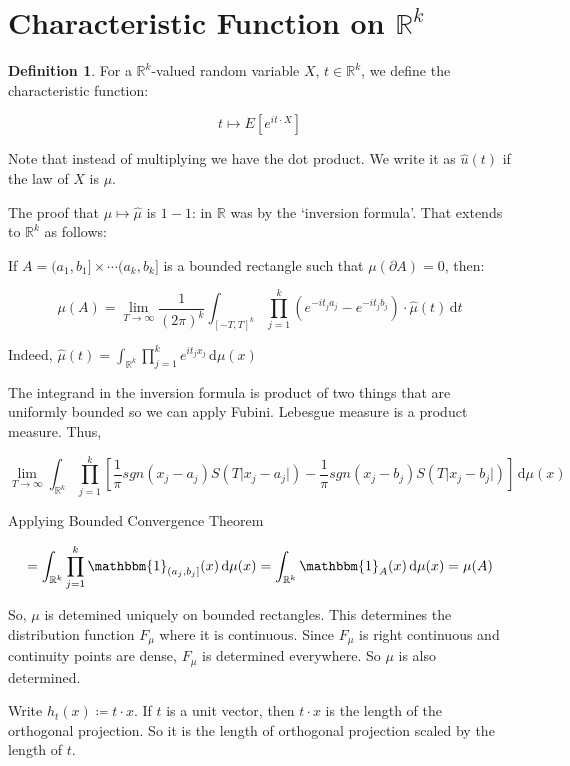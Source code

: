\documentclass{article}
\theoremstyle{definition}
\newtheorem{definition}{Definition}
\begin{document}
\section*{Characteristic Function on \(\mathbb{R}^k\)}

\begin{definition}

For a \(\mathbb{R}^k\)-valued random variable \(X\), \(t\in\mathbb{R}^k\), we define the characteristic function:

\[
    t \mapsto E[e^{it\cdot X}]
\]

Note that instead of multiplying we have the dot product. We write it as \(\hat{u}(t)\) if the law of \(X\) is \(\mu\).

\end{definition}

The proof that \(\mu \mapsto \hat{\mu}\) is \(1-1\): in \(\mathbb{R}\) was by the `inversion formula'. That extends to \(\mathbb{R}^k\) as follows:

If \(A = (a_1,b_1]\times\cdots (a_k,b_k]\) is a bounded rectangle such that \(\mu(\partial A)=0\), then:

\[
    \mu(A) = \lim_{T \to \infty} \frac{1}{(2\pi)^k}\int_{[-T,T]^k}^{} \prod_{j=1}^{k} (e^{-it_j a_j}-e^{-it_j b_j})\cdot\hat{\mu}(t) \,\mathrm{d}t 
\]

Indeed, \(\hat{\mu}(t)=\int_{\mathbb{R}^k}^{} \prod_{j=1}^k e^{i t_j x_j} \,\mathrm{d}\mu(x)\) 

The integrand in the inversion formula is product of two things that are uniformly bounded so we can apply Fubini. Lebesgue measure is a product measure. Thus,

\[
    \lim_{T\to\infty} \int_{\mathbb{R}^k}^{} \prod_{j=1}^k \left[\frac{1}{\pi}sgn(x_j - a_j)S(T\vert x_j - a_j \vert )-\frac{1}{\pi} sgn(x_j - b_j) S(T \vert x_j - b_j \vert )\right] \,\mathrm{d}\mu(x) 
\]

Applying Bounded Convergence Theorem

\[
    = \int_{\mathbb{R}^k}^{} \prod_{j=1}^k \mathbbm{1}_{(a_j,b_j]} (x) \,\mathrm{d}\mu(x) = \int_{\mathbb{R}^k}^{} \mathbbm{1}_{A} (x) \,\mathrm{d}\mu(x) = \mu(A)
\]

So, \(\mu\) is detemined uniquely on bounded rectangles. This determines the distribution function \(F_\mu\) where it is continuous. Since \(F_\mu\) is right continuous and continuity points are dense, \(F_\mu\) is determined everywhere. So \(\mu\) is also determined.

Write \(h_t(x)\coloneqq t\cdot x\). If \(t\) is a unit vector, then \(t\cdot x\) is the length of the orthogonal projection. So it is the length of orthogonal projection scaled by the length of \(t\).
\end{document}
